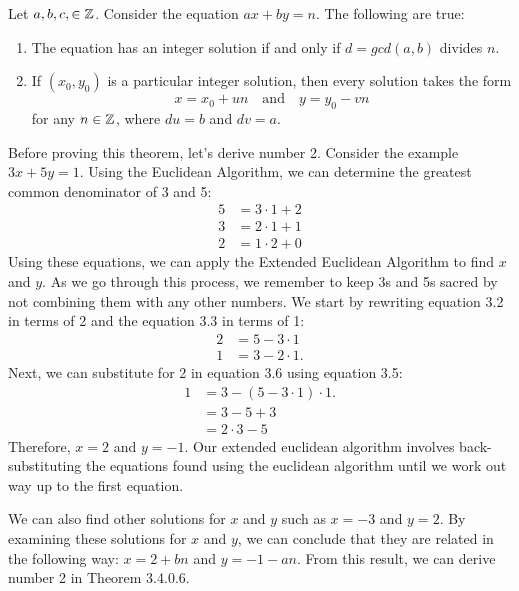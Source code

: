 \begin{theorem}
Let $a, b, c, \in \mathbb{Z}$. Consider the equation $ax + by = n$. The following are true:
\begin{enumerate}
\item The equation has an integer solution if and only if $d = gcd(a,b)$ divides $n$.
\item If $(x_0,y_0)$ is a particular integer solution, then every solution takes the form \[x = x_0 + un \quad \text{and} \quad y = y_0 - vn\] for any $n \in \mathbb{Z}$, where $du = b$ and $dv = a$. 
\end{enumerate}
\end{theorem}
Before proving this theorem, let's derive number 2. Consider the example $3x + 5y = 1$. Using the Euclidean Algorithm, we can determine the greatest common denominator of 3 and 5:
\begin{align*}
5 &= 3 \cdot 1 + 2 \\
3 &= 2 \cdot 1 + 1 \\
2 &= 1 \cdot 2 + 0 
\end{align*}
Using these equations, we can apply the Extended Euclidean Algorithm to find $x$ and $y$. As we go through this process, we remember to keep 3s and 5s sacred by not combining them with any other numbers. We start by rewriting equation 3.2 in terms of 2 and the equation 3.3 in terms of 1: 
\begin{align*}
2 &= 5 - 3 \cdot 1 \\
1 &= 3 - 2 \cdot 1. 
\end{align*}
Next, we can substitute for 2 in equation 3.6 using equation 3.5:
\begin{align*}
1 &= 3 - (5 - 3 \cdot 1) \cdot 1. \\
  &= 3 - 5 + 3 \\ 
  &= 2 \cdot 3 - 5
\end{align*}
Therefore, $x=2$ and $y=-1$. Our extended euclidean algorithm involves back-substituting the equations found using the euclidean algorithm until we work out way up to the first equation.

We can also find other solutions for $x$ and $y$ such as $x = -3$ and $y = 2$. By examining these solutions for $x$ and $y$, we can conclude that they are related in the following way: $x = 2 + bn$ and $y = -1 - an$. From this result, we can derive number 2 in Theorem 3.4.0.6.